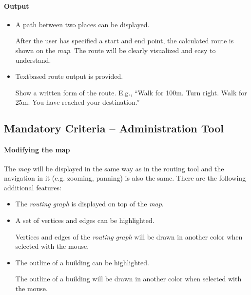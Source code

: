 \paragraph{Output}
\begin{itemize}
	\item A path between two places can be displayed.
		\begin{addmargin}[7mm]{0mm}
			After the user has specified a start and end point, the calculated route is shown on the \textit{map}. The route will be clearly visualized and easy to understand.
		\end{addmargin}
	\item Textbased route output is provided.
		\begin{addmargin}[7mm]{0mm}
			Show a written form of the route. E.g., ``Walk for 100m. Turn right. Walk for 25m. You have reached your destination.'' %
		\end{addmargin}
\end{itemize}

\subsection{Mandatory Criteria -- Administration Tool}

\paragraph{Modifying the map}
The \textit{map} will be displayed in the same way as in the routing tool and the navigation in it (e.g. zooming, panning) is also the same. There are the following additional features:

\begin{itemize}
	\item The \textit{routing graph} is displayed on top of the \textit{map}.
	\item A set of vertices and edges can be highlighted.
		\begin{addmargin}[7mm]{0mm}
			Vertices and edges of the \textit{routing graph} will be drawn in another color when selected with the mouse.
		\end{addmargin}
	\item The outline of a building can be highlighted. %
		\begin{addmargin}[7mm]{0mm}
			The outline of a building will be drawn in another color when selected with the mouse.
		\end{addmargin}
\end{itemize}

